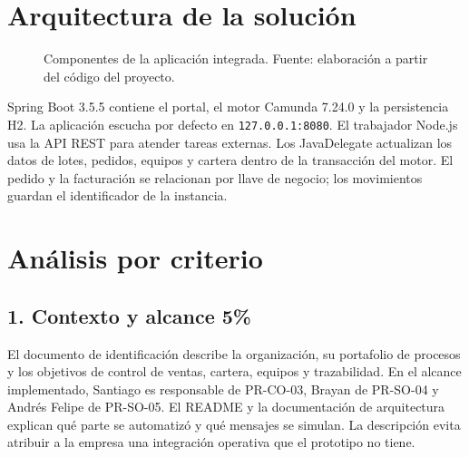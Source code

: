 \documentclass[11pt,letterpaper]{article}
\newcommand{\ruta}[1]{\nolinkurl{#1}}
\newcommand{\criterio}[3]{\needspace{8\baselineskip}\subsection*{#1. #2 \hfill\normalsize\color{gris}#3}}
\begin{document}
\section*{Arquitectura de la solución}
\begin{figure}[htbp]
\centering
{}
\caption{Componentes de la aplicación integrada. Fuente: elaboración a partir del código del proyecto.}
\end{figure}

Spring Boot 3.5.5 contiene el portal, el motor Camunda 7.24.0 y la persistencia H2. La aplicación escucha por defecto en \ruta{127.0.0.1:8080}. El trabajador Node.js usa la API REST para atender tareas externas. Los JavaDelegate actualizan los datos de lotes, pedidos, equipos y cartera dentro de la transacción del motor. El pedido y la facturación se relacionan por llave de negocio; los movimientos guardan el identificador de la instancia.

\section*{Análisis por criterio}
\criterio{1}{Contexto y alcance}{5\%}
El documento de identificación describe la organización, su portafolio de procesos y los objetivos de control de ventas, cartera, equipos y trazabilidad. En el alcance implementado, Santiago es responsable de PR-CO-03, Brayan de PR-SO-04 y Andrés Felipe de PR-SO-05. El README y la documentación de arquitectura explican qué parte se automatizó y qué mensajes se simulan. La descripción evita atribuir a la empresa una integración operativa que el prototipo no tiene.
\end{document}
